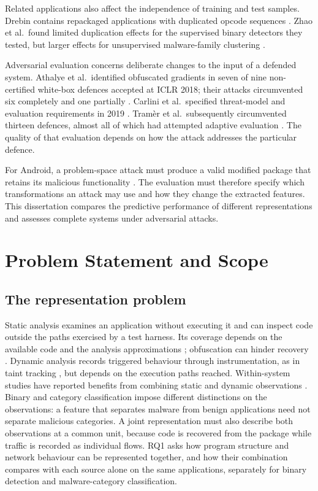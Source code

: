 Related applications also affect the independence of training and test samples. Drebin
contains repackaged applications with duplicated opcode sequences
\cite{irolla2018duplication}. Zhao et al.\ found limited duplication effects for the
supervised binary detectors they tested, but larger effects for unsupervised malware-family
clustering \cite{zhao2021impact}.

Adversarial evaluation concerns deliberate changes to the input of a defended system.
Athalye et al.\ identified obfuscated gradients in seven of nine non-certified white-box
defences accepted at ICLR 2018; their attacks circumvented six completely and one partially
\cite{athalye2018obfuscated}. Carlini et al.\ specified threat-model and evaluation
requirements in 2019 \cite{carlini2019evaluating}. Tramèr et al.\ subsequently circumvented
thirteen defences, almost all of which had attempted adaptive evaluation
\cite{tramer2020adaptive}. The quality of that evaluation depends on how the attack addresses
the particular defence.

For Android, a problem-space attack must produce a valid modified package that retains its
malicious functionality \cite{pierazzi2020intriguing}. The evaluation must therefore specify
which transformations an attack may use and how they change the extracted features. This
dissertation compares the predictive performance of different representations and assesses
complete systems under adversarial attacks.

\section{Problem Statement and Scope}
\label{sec:intro:problem}

\subsection*{The representation problem}

Static analysis examines an application without executing it and can inspect code outside
the paths exercised by a test harness. Its coverage depends on the available code and the
analysis approximations \cite{li2017static}; obfuscation can hinder recovery \cite{moser2007limits}.
Dynamic analysis records triggered behaviour through instrumentation, as in taint tracking
\cite{enck2014taintdroid}, but depends on the execution paths reached. Within-system studies
have reported benefits from combining static and dynamic observations
\cite{onwuzurike2018family}. Binary and category classification impose different distinctions
on the observations: a feature that separates malware from benign applications need not
separate malicious categories. A joint representation must also describe both observations
at a common unit, because code is recovered from the package while traffic is recorded as
individual flows. RQ1 asks how program structure and network behaviour can be represented
together, and how their combination compares with each source alone on the same applications,
separately for binary detection and malware-category classification.

